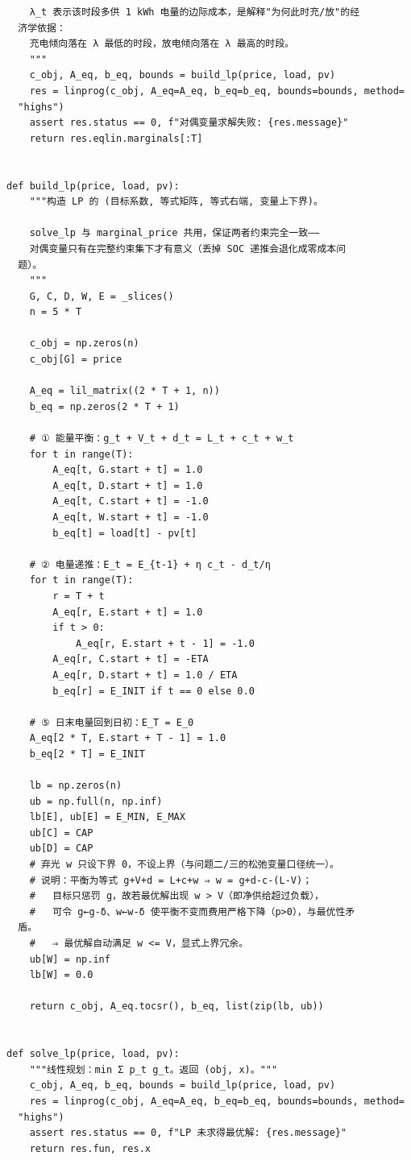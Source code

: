 \begin{verbatim}
    λ_t 表示该时段多供 1 kWh 电量的边际成本，是解释"为何此时充/放"的经
  济学依据：
    充电倾向落在 λ 最低的时段，放电倾向落在 λ 最高的时段。
    """
    c_obj, A_eq, b_eq, bounds = build_lp(price, load, pv)
    res = linprog(c_obj, A_eq=A_eq, b_eq=b_eq, bounds=bounds, method=
  "highs")
    assert res.status == 0, f"对偶变量求解失败: {res.message}"
    return res.eqlin.marginals[:T]


def build_lp(price, load, pv):
    """构造 LP 的 (目标系数, 等式矩阵, 等式右端, 变量上下界)。

    solve_lp 与 marginal_price 共用，保证两者约束完全一致——
    对偶变量只有在完整约束集下才有意义（丢掉 SOC 递推会退化成零成本问
  题）。
    """
    G, C, D, W, E = _slices()
    n = 5 * T

    c_obj = np.zeros(n)
    c_obj[G] = price

    A_eq = lil_matrix((2 * T + 1, n))
    b_eq = np.zeros(2 * T + 1)

    # ① 能量平衡：g_t + V_t + d_t = L_t + c_t + w_t
    for t in range(T):
        A_eq[t, G.start + t] = 1.0
        A_eq[t, D.start + t] = 1.0
        A_eq[t, C.start + t] = -1.0
        A_eq[t, W.start + t] = -1.0
        b_eq[t] = load[t] - pv[t]

    # ② 电量递推：E_t = E_{t-1} + η c_t - d_t/η
    for t in range(T):
        r = T + t
        A_eq[r, E.start + t] = 1.0
        if t > 0:
            A_eq[r, E.start + t - 1] = -1.0
        A_eq[r, C.start + t] = -ETA
        A_eq[r, D.start + t] = 1.0 / ETA
        b_eq[r] = E_INIT if t == 0 else 0.0

    # ⑤ 日末电量回到日初：E_T = E_0
    A_eq[2 * T, E.start + T - 1] = 1.0
    b_eq[2 * T] = E_INIT

    lb = np.zeros(n)
    ub = np.full(n, np.inf)
    lb[E], ub[E] = E_MIN, E_MAX
    ub[C] = CAP
    ub[D] = CAP
    # 弃光 w 只设下界 0，不设上界（与问题二/三的松弛变量口径统一）。
    # 说明：平衡为等式 g+V+d = L+c+w ⇒ w = g+d-c-(L-V)；
    #   目标只惩罚 g，故若最优解出现 w > V（即净供给超过负载），
    #   可令 g←g-δ、w←w-δ 使平衡不变而费用严格下降（p>0），与最优性矛
  盾。
    #   ⇒ 最优解自动满足 w <= V，显式上界冗余。
    ub[W] = np.inf
    lb[W] = 0.0

    return c_obj, A_eq.tocsr(), b_eq, list(zip(lb, ub))


def solve_lp(price, load, pv):
    """线性规划：min Σ p_t g_t。返回 (obj, x)。"""
    c_obj, A_eq, b_eq, bounds = build_lp(price, load, pv)
    res = linprog(c_obj, A_eq=A_eq, b_eq=b_eq, bounds=bounds, method=
  "highs")
    assert res.status == 0, f"LP 未求得最优解: {res.message}"
    return res.fun, res.x



\end{verbatim}
